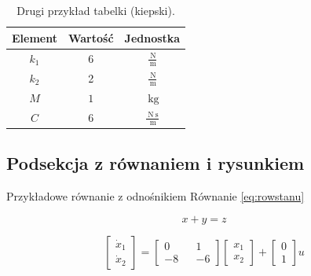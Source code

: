 \documentclass{sprawozdanie-agh}
\begin{document}
    

    \begin{table}[h!]
    \begin{center}
    \begin{tabular}{ c | c | c }
		 Element & Wartość & Jednostka \\ 
		 \hline\hline
		 $k_1$ & 6 & $\frac{\qty[per-mode = symbol]{}{\newton }}{\qty[per-mode = symbol]{}{\meter }}$ \\ 
		 \hline
		 $k_2$ & 2 & $\frac{\qty[per-mode = symbol]{}{\newton }}{\qty[per-mode = symbol]{}{\meter }}$ \\ 
		 \hline
		 $M$ & $1$ & $\qty[per-mode = symbol]{}{\kilogram}$ \\
		 \hline
		 $C$ & $6$ & $\frac{\qty[per-mode = symbol]{}{\newton }\qty[per-mode = symbol]{}{\second }}{\qty[per-mode = symbol]{}{\meter }}$ \\
    \end{tabular}
    \caption{Drugi przykład tabelki (kiepski).}\label{tab2}
    \end{center}
    \end{table}
    
    

\subsection{Podsekcja z równaniem i rysunkiem}
    Przykładowe równanie z odnośnikiem Równanie \ref{eq:rowstanu}
    
    \begin{equation}
    x + y = z
    \label{eq:rowstanu}
    \end{equation}

    \begin{equation} 
    \label{eqn_state2}
        \begin{bmatrix} 
            \dot{x}_1 \\  \dot{x}_2 
        \end{bmatrix} = 
        \begin{bmatrix} 0 && 1 \\ 
                        -8 && -6
        \end{bmatrix}
        \begin{bmatrix} 
            {x}_1 \\  {x}_2 
        \end{bmatrix} +
        \begin{bmatrix} 
            0 \\  1 
        \end{bmatrix} u
    \end{equation}
\end{document}
